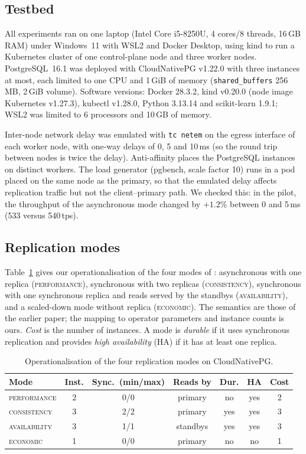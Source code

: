 \documentclass[smallextended]{svjour3}
\newcommand{\perf}{\textsc{performance}}
\newcommand{\cons}{\textsc{consistency}}
\newcommand{\avail}{\textsc{availability}}
\newcommand{\econ}{\textsc{economic}}
\begin{document}
\subsection{Testbed}
All experiments ran on one laptop (Intel Core i5-8250U, 4 cores/8 threads, 16\,GB RAM) under Windows~11 with WSL2 and Docker Desktop, using kind to run a Kubernetes cluster of one control-plane node and three worker nodes. PostgreSQL~16.1 was deployed with CloudNativePG v1.22.0 with three instances at most, each limited to one CPU and 1\,GiB of memory (\texttt{shared\_buffers} 256\,MB, 2\,GiB volume). Software versions: Docker 28.3.2, kind v0.20.0 (node image Kubernetes v1.27.3), kubectl v1.28.0, Python 3.13.14 and scikit-learn 1.9.1; WSL2 was limited to 6 processors and 10\,GB of memory.

Inter-node network delay was emulated with \texttt{tc netem} \cite{hemminger2005} on the egress interface of each worker node, with one-way delays of 0, 5 and 10\,ms (so the round trip between nodes is twice the delay). Anti-affinity places the PostgreSQL instances on distinct workers. The load generator (pgbench, scale factor 10) runs in a pod placed on the same node as the primary, so that the emulated delay affects replication traffic but not the client--primary path. We checked this: in the pilot, the throughput of the asynchronous mode changed by $+1.2\%$ between 0 and 5\,ms (533 versus 540\,tps).

\subsection{Replication modes}
Table~\ref{tab:modes} gives our operationalisation of the four modes of \cite{jerrari2026iaha}: asynchronous with one replica (\perf), synchronous with two replicas (\cons), synchronous with one synchronous replica and reads served by the standbys (\avail), and a scaled-down mode without replica (\econ). The semantics are those of the earlier paper; the mapping to operator parameters and instance counts is ours. \emph{Cost} is the number of instances. A mode is \emph{durable} if it uses synchronous replication and provides \emph{high availability} (HA) if it has at least one replica.

\begin{table}[t]
\centering\footnotesize
\begin{tabular}{lcccccc}
\toprule
Mode & Inst. & Sync.\ (min/max) & Reads by & Dur. & HA & Cost \\
\midrule
\perf & 2 & 0/0 & primary & no & yes & 2 \\
\cons & 3 & 2/2 & primary & yes & yes & 3 \\
\avail & 3 & 1/1 & standbys & yes & yes & 3 \\
\econ & 1 & 0/0 & primary & no & no & 1 \\
\bottomrule
\end{tabular}
\caption{Operationalisation of the four replication modes on CloudNativePG.}\label{tab:modes}
\end{table}
\end{document}
